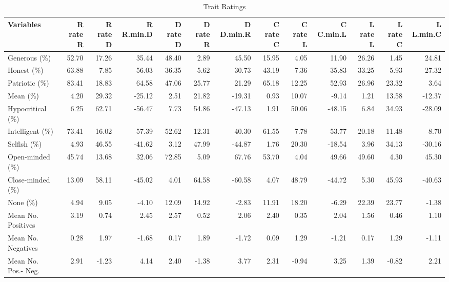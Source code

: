 \documentclass[a4paper]{article}
\begin{document}
\begin{sidewaystable}[ht]
\begin{center}
\caption{Trait Ratings}
\label{tab:one}
{\scriptsize
\begin{tabular}{lrrrrrrrrrrrr}
  \hline
Variables & R rate R & R rate D & R R.min.D & D rate D & D rate R & D D.min.R & C rate C & C rate L & C C.min.L & L rate L & L rate C & L L.min.C \\ 
  \hline
Generous (\%) & 52.70 & 17.26 & 35.44 & 48.40 & 2.89 & 45.50 & 15.95 & 4.05 & 11.90 & 26.26 & 1.45 & 24.81 \\ 
  Honest (\%) & 63.88 & 7.85 & 56.03 & 36.35 & 5.62 & 30.73 & 43.19 & 7.36 & 35.83 & 33.25 & 5.93 & 27.32 \\ 
  Patriotic (\%) & 83.41 & 18.83 & 64.58 & 47.06 & 25.77 & 21.29 & 65.18 & 12.25 & 52.93 & 26.96 & 23.32 & 3.64 \\ 
  Mean (\%) & 4.20 & 29.32 & -25.12 & 2.51 & 21.82 & -19.31 & 0.93 & 10.07 & -9.14 & 1.21 & 13.58 & -12.37 \\ 
  Hypocritical (\%) & 6.25 & 62.71 & -56.47 & 7.73 & 54.86 & -47.13 & 1.91 & 50.06 & -48.15 & 6.84 & 34.93 & -28.09 \\ 
  Intelligent (\%) & 73.41 & 16.02 & 57.39 & 52.62 & 12.31 & 40.30 & 61.55 & 7.78 & 53.77 & 20.18 & 11.48 & 8.70 \\ 
  Selfish (\%) & 4.93 & 46.55 & -41.62 & 3.12 & 47.99 & -44.87 & 1.76 & 20.30 & -18.54 & 3.96 & 34.13 & -30.16 \\ 
  Open-minded (\%) & 45.74 & 13.68 & 32.06 & 72.85 & 5.09 & 67.76 & 53.70 & 4.04 & 49.66 & 49.60 & 4.30 & 45.30 \\ 
  Close-minded (\%) & 13.09 & 58.11 & -45.02 & 4.01 & 64.58 & -60.58 & 4.07 & 48.79 & -44.72 & 5.30 & 45.93 & -40.63 \\ 
  None (\%) & 4.94 & 9.05 & -4.10 & 12.09 & 14.92 & -2.83 & 11.91 & 18.20 & -6.29 & 22.39 & 23.77 & -1.38 \\ 
  Mean No. Positives & 3.19 & 0.74 & 2.45 & 2.57 & 0.52 & 2.06 & 2.40 & 0.35 & 2.04 & 1.56 & 0.46 & 1.10 \\ 
  Mean No. Negatives & 0.28 & 1.97 & -1.68 & 0.17 & 1.89 & -1.72 & 0.09 & 1.29 & -1.21 & 0.17 & 1.29 & -1.11 \\ 
  Mean No. Pos.- Neg. & 2.91 & -1.23 & 4.14 & 2.40 & -1.38 & 3.77 & 2.31 & -0.94 & 3.25 & 1.39 & -0.82 & 2.21 \\ 
   \hline
\end{tabular}
}
\end{center}
\end{sidewaystable}\clearpage
\end{document}
